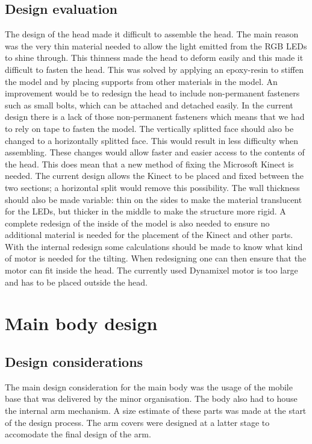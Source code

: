 \documentclass[technical_document.tex]{subfiles}
\begin{document}
\subsection{Design evaluation}
The design of the head made it difficult to assemble the head. The main reason was the very thin material needed to allow the light emitted from the RGB LEDs to shine through. This thinness made the head to deform easily and this made it difficult to fasten the head. This was solved by applying an epoxy-resin to stiffen the model and by placing supports from other materials in the model. An improvement would be to redesign the head to include non-permanent fasteners such as small bolts, which can be attached and detached easily. In the current design there is a lack of those non-permanent fasteners which means that we had to rely on tape to fasten the model. The vertically splitted face should also be changed to a horizontally splitted face. This would result in less difficulty when assembling. These changes would allow faster and easier access to the contents of the head. This does mean that a new method of fixing the Microsoft Kinect is needed. The current design allows the Kinect to be placed and fixed between the two sections; a horizontal split would remove this possibility. The wall thickness should also be made variable: thin on the sides to make the material translucent for the LEDs, but thicker in the middle to make the structure more rigid. A complete redesign of the inside of the model is also needed to ensure no additional material is needed for the placement of the Kinect and other parts. With the internal redesign some calculations should be made to know what kind of motor is needed for the tilting. When redesigning one can then ensure that the motor can fit inside the head. The currently used Dynamixel motor is too large and has to be placed outside the head.

\section{Main body design}
\subsection{Design considerations}
The main design consideration for the main body was the usage of the mobile base that was delivered by the minor organisation. The body also had to house the internal arm mechanism. A size estimate of these parts was made at the start of the design process. The arm covers were designed at a latter stage to accomodate the final design of the arm.
\end{document}
